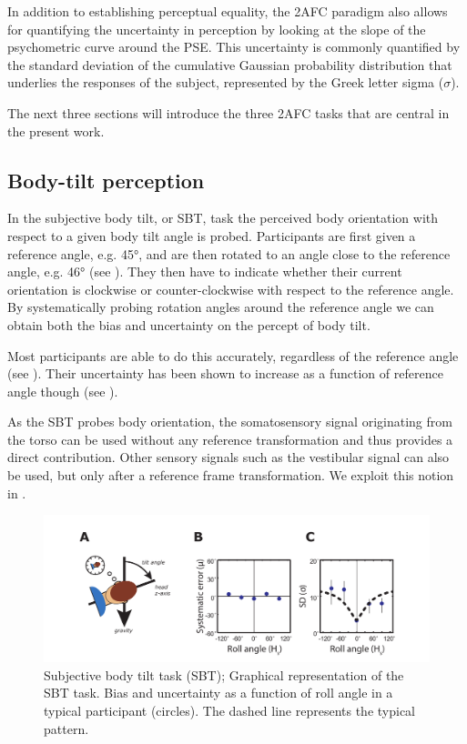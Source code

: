 In addition to establishing perceptual equality, the 2AFC paradigm also allows for quantifying the uncertainty in perception by looking at the slope of the psychometric curve around the PSE. This uncertainty is commonly quantified by the standard deviation of the cumulative Gaussian probability distribution that underlies the responses of the subject, represented by the Greek letter sigma ($\sigma$).

The next three sections will introduce the three 2AFC tasks that are central in the present work.

\subsection{Body-tilt perception}
In the subjective body tilt, or SBT, task the perceived body orientation with respect to a given body tilt angle is probed. Participants are first given a reference angle, e.g. 45\si{\degree}, and are then rotated to an angle close to the reference angle, e.g. 46\si{\degree} (see ). They then have to indicate whether their current orientation is clockwise or counter-clockwise with respect to the reference angle. By systematically probing rotation angles around the reference angle we can obtain both the bias and uncertainty on the percept of body tilt.

Most participants are able to do this accurately, regardless of the reference angle (see ). Their uncertainty has been shown to increase as a function of reference angle though (see ).

As the SBT probes body orientation, the somatosensory signal originating from the torso can be used without any reference transformation and thus provides a direct contribution. Other sensory signals such as the vestibular signal can also be used, but only after a reference frame transformation. We exploit this notion in .

\begin{figure}
    \includegraphics[width=1.0\textwidth]{src/intro/figures/sbt.pdf}

    \caption{Subjective body tilt task (SBT);  Graphical representation of the SBT task.  Bias and  uncertainty as a function of roll angle in a typical participant (circles). The dashed line represents the typical pattern.}
    \label{intro:fig4}
\end{figure}


